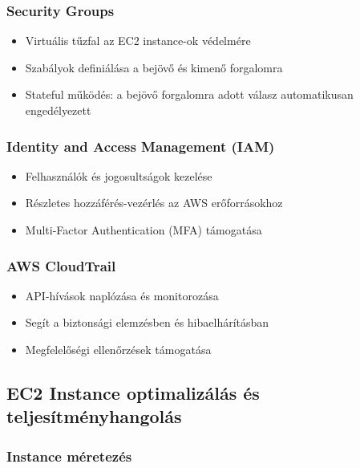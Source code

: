 \documentclass[a4paper,12pt]{article}
\begin{document}
    \subsubsection{Security Groups}

    \begin{itemize}
        \item Virtuális tűzfal az EC2 instance-ok védelmére
        \item Szabályok definiálása a bejövő és kimenő forgalomra
        \item Stateful működés: a bejövő forgalomra adott válasz automatikusan engedélyezett
    \end{itemize}

    \subsubsection{Identity and Access Management (IAM)}

    \begin{itemize}
        \item Felhasználók és jogosultságok kezelése
        \item Részletes hozzáférés-vezérlés az AWS erőforrásokhoz
        \item Multi-Factor Authentication (MFA) támogatása
    \end{itemize}

    \subsubsection{AWS CloudTrail}

    \begin{itemize}
        \item API-hívások naplózása és monitorozása
        \item Segít a biztonsági elemzésben és hibaelhárításban
        \item Megfelelőségi ellenőrzések támogatása
    \end{itemize}

    \subsection{EC2 Instance optimalizálás és teljesítményhangolás}

    \subsubsection{Instance méretezés}
\end{document}

